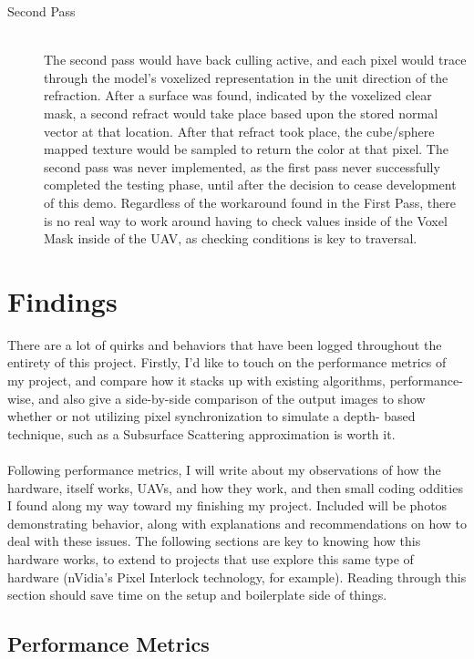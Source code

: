\documentclass[a4paper, 12pt]{article}
\begin{document}
\begin{description}
\item[Second Pass] \hfill \\

The second pass would have back culling active, and each pixel would trace
through the model's voxelized representation in the unit direction of the
refraction. After a surface was found, indicated by the voxelized clear mask,
a second refract would take place based upon the stored normal vector at that
location. After that refract took place, the cube/sphere mapped texture would
be sampled to return the color at that pixel. The second pass was never
implemented, as the first pass never successfully completed the testing phase,
until after the decision to cease development of this demo. Regardless of the
workaround found in the First Pass, there is no real way to work around having
to check values inside of the Voxel Mask inside of the UAV, as checking
conditions is key to traversal.

\end{description}

\section{Findings}

There are a lot of quirks and behaviors that have been logged throughout the
entirety of this project. Firstly, I'd like to touch on the performance
metrics of my project, and compare how it stacks up with existing algorithms,
performance-wise, and also give a side-by-side comparison of the output images
to show whether or not utilizing pixel synchronization to simulate a depth-
based technique, such as a Subsurface Scattering approximation is worth it. \\
\\ Following performance metrics, I will write about my observations of how
the hardware, itself works, UAVs, and how they work, and then small coding
oddities I found along my way toward my finishing my project. Included will be
photos demonstrating behavior, along with explanations and recommendations on
how to deal with these issues. The following sections are key to knowing how
this hardware works, to extend to projects that use explore this same type of
hardware (nVidia's Pixel Interlock technology, for example). Reading through
this section should save time on the setup and boilerplate side of things.

\subsection{Performance Metrics}
\label{section:findings}
\end{document}
